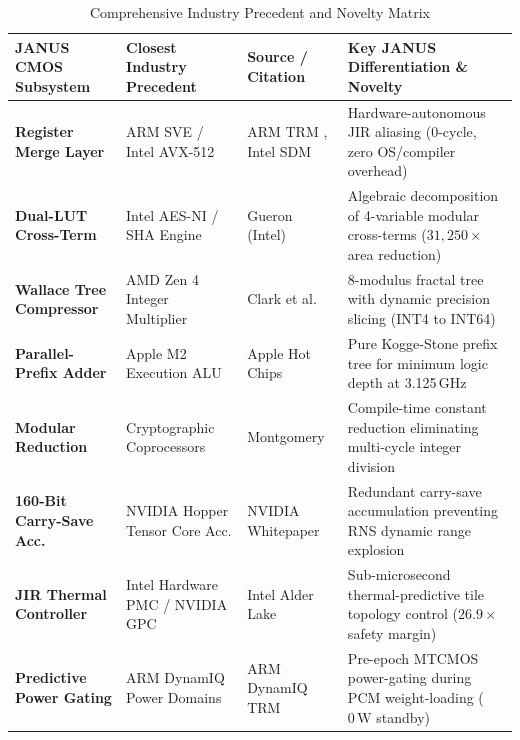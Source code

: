 \documentclass[10pt,journal,compsoc]{IEEEtran}
\begin{document}
\begin{table}[t]
\caption{Comprehensive Industry Precedent and Novelty Matrix}
\label{tab:precedents}
\centering
\begin{tabularx}{\textwidth}{@{}p{3.2cm} p{3.2cm} p{3.2cm} X@{}}
\toprule
\textbf{JANUS CMOS Subsystem} & \textbf{Closest Industry Precedent} & \textbf{Source / Citation} & \textbf{Key JANUS Differentiation \& Novelty} \\
\midrule
\textbf{Register Merge Layer} & ARM SVE / Intel AVX-512 & ARM TRM \cite{arm_sve_ref}, Intel SDM \cite{intel_sdm_avx512} & Hardware-autonomous JIR aliasing (0-cycle, zero OS/compiler overhead) \\
\addlinespace[2pt]
\textbf{Dual-LUT Cross-Term} & Intel AES-NI / SHA Engine & Gueron (Intel) \cite{intel_aes_ni} & Algebraic decomposition of 4-variable modular cross-terms ($31,250\times$ area reduction) \\
\addlinespace[2pt]
\textbf{Wallace Tree Compressor} & AMD Zen 4 Integer Multiplier & Clark et al. \cite{amd_zen4_hotchips, wallace1964multiplier} & 8-modulus fractal tree with dynamic precision slicing (INT4 to INT64) \\
\addlinespace[2pt]
\textbf{Parallel-Prefix Adder} & Apple M2 Execution ALU & Apple Hot Chips \cite{apple_m2_hotchips, kogge1973parallel} & Pure Kogge-Stone prefix tree for minimum logic depth at 3.125\,GHz \\
\addlinespace[2pt]
\textbf{Modular Reduction} & Cryptographic Coprocessors & Montgomery \cite{montgomery1985modular} & Compile-time constant reduction eliminating multi-cycle integer division \\
\addlinespace[2pt]
\textbf{160-Bit Carry-Save Acc.} & NVIDIA Hopper Tensor Core Acc. & NVIDIA Whitepaper \cite{nvidia_hopper_h100} & Redundant carry-save accumulation preventing RNS dynamic range explosion \\
\addlinespace[2pt]
\textbf{JIR Thermal Controller} & Intel Hardware PMC / NVIDIA GPC & Intel Alder Lake \cite{intel_alder_lake_pmc} & Sub-microsecond thermal-predictive tile topology control ($26.9\times$ safety margin) \\
\addlinespace[2pt]
\textbf{Predictive Power Gating} & ARM DynamIQ Power Domains & ARM DynamIQ TRM \cite{arm_dynamiq_trm, arm_cortex_a76_trm} & Pre-epoch MTCMOS power-gating during PCM weight-loading ($0\,\text{W}$ standby) \\
\bottomrule
\end{tabularx}
\end{table}
\end{document}
